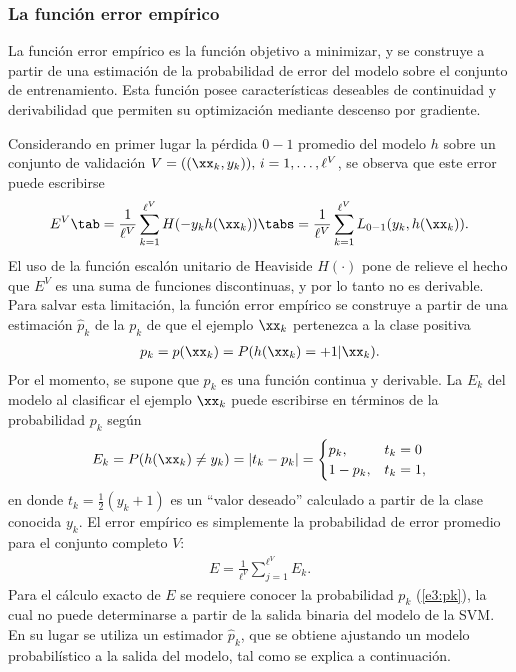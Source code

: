 %
\subsubsection{La función error empírico}
%
La función error empírico es la función objetivo a minimizar, y se
construye a partir de una estimación de la probabilidad de error del
modelo sobre el conjunto de entrenamiento.
Esta función posee características deseables de continuidad y
derivabilidad que permiten su optimización mediante descenso por
gradiente.

Considerando en primer lugar la pérdida $0-1$ promedio del modelo $h$
sobre un conjunto de validación $V=((\xx_k,y_k)),\,i=1,\ldots,\ell^V$,
se observa que este error puede escribirse
%
\begin{align}
\label{e3:error-test-alt}
E^V \tab = \frac{1}{\ell^V}\sum_{k=1}^{\ell^V} H(-{y}_k {h}(\xx_k))
\tabs = \frac{1}{\ell^V}\sum_{k=1}^{\ell^V} L_{0-1}(y_k,h(\xx_k)).
\end{align}
%
El uso de la función escalón unitario de Heaviside $H(\cdot)$ pone de
relieve el hecho que $E^V$ es una suma de funciones discontinuas, y
por lo tanto no es derivable.
Para salvar esta limitación, la función error empírico se construye a
partir de una estimación $\hat{p}_k$ de la  $p_k$ de que el ejemplo $\xx_k$ pertenezca a la clase
positiva
%
\begin{align}
  \label{e3:pk}
  p_k = p(\xx_k) = P(h(\xx_k)=+1|\xx_k).
\end{align}
%
Por el momento, se supone que $p_k$ es una función continua y
derivable.
La  $E_k$ del modelo al clasificar el ejemplo
$\xx_k$ puede escribirse en términos de la probabilidad $p_k$ según
%
\begin{align}
\label{e3:Ek}
  E_k = P(h(\xx_k)\neq y_k) = |t_k-{p}_k| =
  \begin{cases}
    {p}_k, & t_k=0\\ 1-{p}_k, & t_k = 1,
  \end{cases}
\end{align}
%
en donde $t_k=\frac{1}{2}({y_k+1})$ es un ``valor deseado'' calculado
a partir de la clase conocida $y_k$.
El error empírico es simplemente la probabilidad de error promedio
para el conjunto completo $V$:
%
\begin{align}
\label{Err1}
  E = \frac{1}{\ell^V}\sum_{j=1}^{\ell^V} E_k.
\end{align}
%
Para el cálculo exacto de $E$ se requiere conocer la probabilidad
$p_k$ (\ref{e3:pk}), la cual no puede determinarse a partir de la
salida binaria del modelo de la SVM.
En su lugar se utiliza un estimador $\hat{p}_k$, que se obtiene
ajustando un modelo probabilístico a la salida del modelo, tal como se
explica a continuación.
